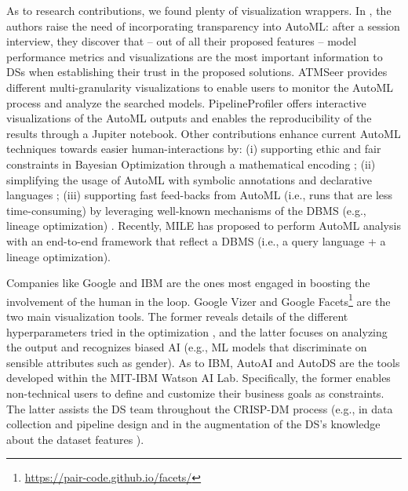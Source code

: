 As to research contributions, we found plenty of visualization wrappers.
In \cite{drozdal2020trust}, the authors raise the need of incorporating transparency into AutoML: after a session interview, they discover that -- out of all their proposed features -- model performance metrics and visualizations are the most important information to DSs when establishing their trust in the proposed solutions.
ATMSeer \cite{wang2019atmseer} provides different multi-granularity visualizations to enable users to monitor the AutoML process and analyze the searched models.
PipelineProfiler \cite{ono2020pipelineprofiler} offers interactive visualizations of the AutoML outputs and enables the reproducibility of the results through a Jupiter notebook.
Other contributions enhance current AutoML techniques towards easier human-interactions by: (i) supporting ethic and fair constraints in Bayesian Optimization through a mathematical encoding \cite{perrone2021fair, yaghini2021human}; (ii) simplifying the usage of AutoML with symbolic annotations \cite{peng2020pyglove} and declarative languages \cite{kraska2013mlbase}; (iii) supporting fast feed-backs from AutoML (i.e., runs that are less time-consuming) by leveraging well-known mechanisms of the DBMS (e.g., lineage optimization) \cite{vartak2015supporting, xin2018accelerating}.
Recently, MILE \cite{lee2020human} has proposed to perform AutoML analysis with an end-to-end framework that reflect a DBMS (i.e., a query language + a lineage optimization).

Companies like Google and IBM are the ones most engaged in boosting the involvement of the human in the loop.
Google Vizer \cite{golovin2017google} and Google Facets\footnote{\url{https://pair-code.github.io/facets/}} are the two main visualization tools.
The former reveals details of the different hyperparameters tried in the optimization \cite{golovin2017google}, and the latter focuses on analyzing the output and recognizes biased AI (e.g., ML models that discriminate on sensible attributes such as gender).
As to IBM, AutoAI \cite{wang2020autoai} and AutoDS \cite{wang2021autods} are the tools developed within the MIT-IBM Watson AI Lab.
Specifically, the former enables non-technical users to define and customize their business goals as constraints. 
The latter assists the DS team throughout the CRISP-DM process (e.g., in data collection and pipeline design \cite{muller2019data, wang2021autods} and in the augmentation of the DS's knowledge about the dataset features \cite{drozdal2020trust}).

